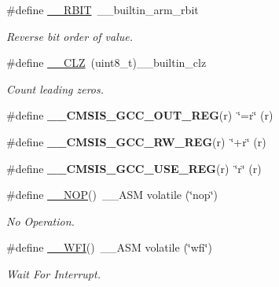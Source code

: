 \begin{DoxyCompactItemize}
\#define \hyperlink{group___c_m_s_i_s___core___instruction_interface_gab83768933a612816fad669db5488366f}{\+\_\+\+\_\+\+R\+B\+IT}~\+\_\+\+\_\+builtin\+\_\+arm\+\_\+rbit
\begin{DoxyCompactList}\small\item\em Reverse bit order of value. \end{DoxyCompactList}\item 
\#define \hyperlink{group___c_m_s_i_s___core___instruction_interface_ga5d5bb1527e042be4a9fa5a33f65cc248}{\+\_\+\+\_\+\+C\+LZ}~(uint8\+\_\+t)\+\_\+\+\_\+builtin\+\_\+clz
\begin{DoxyCompactList}\small\item\em Count leading zeros. \end{DoxyCompactList}\item 
\mbox{\label{group___c_m_s_i_s___core___instruction_interface_gabc17e391c13c71702366c67cba39c276}} 
\#define {\bfseries \+\_\+\+\_\+\+C\+M\+S\+I\+S\+\_\+\+G\+C\+C\+\_\+\+O\+U\+T\+\_\+\+R\+EG}(r)~\char`\"{}=r\char`\"{} (r)
\item 
\mbox{\label{group___c_m_s_i_s___core___instruction_interface_ga03179f79efee45c226dddfb8d824ad83}} 
\#define {\bfseries \+\_\+\+\_\+\+C\+M\+S\+I\+S\+\_\+\+G\+C\+C\+\_\+\+R\+W\+\_\+\+R\+EG}(r)~\char`\"{}+r\char`\"{} (r)
\item 
\mbox{\label{group___c_m_s_i_s___core___instruction_interface_ga9d94dee7402367961d2cf0accc00fd97}} 
\#define {\bfseries \+\_\+\+\_\+\+C\+M\+S\+I\+S\+\_\+\+G\+C\+C\+\_\+\+U\+S\+E\+\_\+\+R\+EG}(r)~\char`\"{}r\char`\"{} (r)
\item 
\#define \hyperlink{group___c_m_s_i_s___core___instruction_interface_ga0b13f3617dd4af2cd2eb3a311073f717}{\+\_\+\+\_\+\+N\+OP}()~\+\_\+\+\_\+\+A\+SM volatile (\char`\"{}nop\char`\"{})
\begin{DoxyCompactList}\small\item\em No Operation. \end{DoxyCompactList}\item 
\#define \hyperlink{group___c_m_s_i_s___core___instruction_interface_gab28e2b328c4cf23c917ab18a23194f8e}{\+\_\+\+\_\+\+W\+FI}()~\+\_\+\+\_\+\+A\+SM volatile (\char`\"{}wfi\char`\"{})
\begin{DoxyCompactList}\small\item\em Wait For Interrupt. \end{DoxyCompactList}\item 

\end{DoxyCompactItemize}
